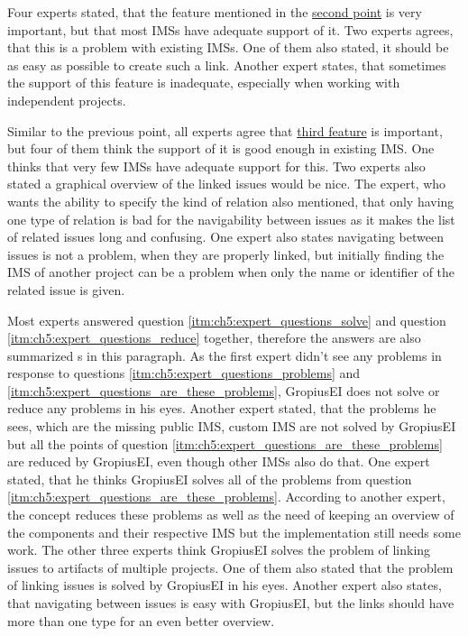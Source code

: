 Four experts stated, that the feature mentioned in the \hyperref[itm:ch5:expert_questions_are_these_problems_2]{second point} is very important,
but that most \glspl{IMS} have adequate support of it.
Two experts agrees, that this is a problem with existing \glspl{IMS}.
One of them also stated, it should be as easy as possible to create such a link.
Another expert states, that sometimes the support of this feature is inadequate, especially when working with independent projects.

Similar to the previous point, all experts agree that \hyperref[itm:ch5:expert_questions_are_these_problems_3]{third feature} is important, 
but four of them think the support of it is good enough in existing \gls{IMS}.
One thinks that very few \glspl{IMS} have adequate support for this.
Two experts also stated a graphical overview of the linked issues would be nice.
The expert, who wants the ability to specify the kind of relation also mentioned, that only having one type of relation is bad for the navigability between issues as it makes the list of related issues long and confusing.
One expert also states navigating between issues is not a problem, when they are properly linked, but initially finding the \gls{IMS} of another project can be a problem when only the name or identifier of the related issue is given.

Most experts answered question \ref{itm:ch5:expert_questions_solve} and question \ref{itm:ch5:expert_questions_reduce} together, 
therefore the answers are also summarized s in this paragraph.
As the first expert didn't see any problems in response to questions \ref{itm:ch5:expert_questions_problems} and \ref{itm:ch5:expert_questions_are_these_problems}, \gls{GropiusEI} does not solve or reduce any problems in his eyes.
Another expert stated, that the problems he sees, which are the missing public \gls{IMS}, custom \gls{IMS} are not solved by \gls{GropiusEI} but all the points of question \ref{itm:ch5:expert_questions_are_these_problems} are reduced by \gls{GropiusEI}, even though other \glspl{IMS} also do that.
One expert stated, that he thinks \gls{GropiusEI} solves all of the problems from question \ref{itm:ch5:expert_questions_are_these_problems}.
According to another expert, the concept reduces these problems as well as the need of keeping an overview of the components and their respective \gls{IMS} but the implementation still needs some work.
The other three experts think \gls{GropiusEI} solves the problem of linking issues to artifacts of multiple projects.
One of them also stated that the problem of linking issues is solved by \gls{GropiusEI} in his eyes.
Another expert also states, that navigating between issues is easy with \gls{GropiusEI}, but the links should have more than one type for an even better overview.

